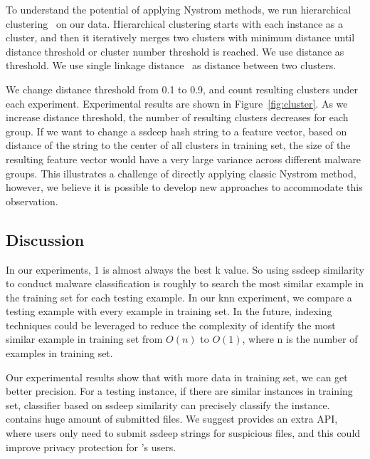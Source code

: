 To understand the potential of applying Nystrom methods, we run hierarchical clustering~\cite{hcluster} on our data.
Hierarchical clustering starts with each instance as a cluster, 
and then it iteratively merges two clusters with minimum distance 
until distance threshold or cluster number threshold is reached. 
We use distance as threshold. 
We use single linkage distance~\cite{single-link} as distance between two clusters. 

We change distance threshold from 0.1 to 0.9, 
and count resulting clusters under each experiment. 
Experimental results are shown in Figure~\ref{fig:cluster}. 
As we increase distance threshold, the number of resulting clusters decreases for each group. 
If we want to change a ssdeep hash string to a feature vector, 
based on distance of the string to the center of all clusters in training set, 
the size of the resulting feature vector would have a very large variance across different malware groups. 
This illustrates a challenge of directly applying
classic Nystrom method, however, we believe
it is possible to develop new approaches to
accommodate this observation.


\subsection{Discussion}

In our experiments, 1 is almost always the best k value. 
So using ssdeep similarity to conduct malware classification 
is roughly to search the most similar example in the training set for each testing example.
In our knn experiment, we compare a testing example with every example in training set. 
In the future, indexing techniques could be leveraged to reduce the complexity of identify 
the most similar example in training set from $O(n)$ to $O(1)$, where n is the number of examples in training set. 

Our experimental results show that with more data in training set, 
we can get better precision. 
For a testing instance, if there are similar instances in training set, 
classifier based on ssdeep similarity can precisely classify the instance. 
\vt{} contains huge amount of submitted files. We suggest \vt{} provides an extra API, 
where users only need to submit ssdeep strings for suspicious files, 
and this could improve privacy protection for \vt{}’s users.  



